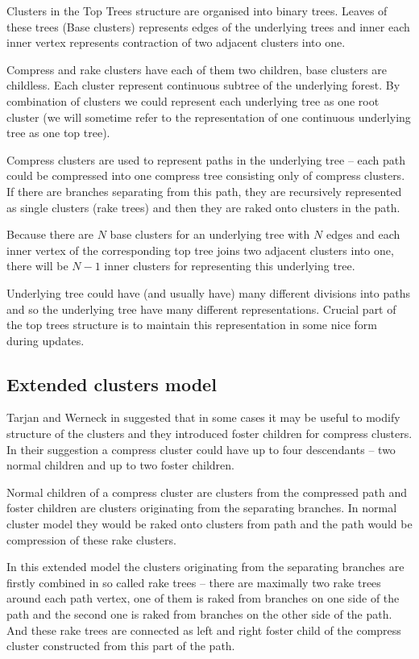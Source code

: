 Clusters in the Top Trees structure are organised into binary trees. Leaves of
these trees (Base clusters) represents edges of the underlying trees and inner
each inner vertex represents contraction of two adjacent clusters into one.

Compress and rake clusters have each of them two children, base clusters are
childless. Each cluster represent continuous subtree of the underlying forest.
By combination of clusters we could represent each underlying tree as one {\I
root cluster} (we will sometime refer to the representation of one continuous
underlying tree as one {\I top tree}).

Compress clusters are used to represent paths in the underlying tree -- each
path could be compressed into one {\I compress tree} consisting only of compress
clusters. If there are branches separating from this path, they are recursively
represented as single clusters ({\I rake trees}) and then they are
{\I raked onto} clusters in the path.

Because there are $N$ base clusters for an underlying tree with $N$ edges and
each inner vertex of the corresponding top tree joins two adjacent clusters into
one, there will be $N-1$ inner clusters for representing this underlying tree.

Underlying tree could have (and usually have) many different divisions into
paths and so the underlying tree have many different representations. Crucial
part of the top trees structure is to maintain this representation in some nice
form during updates.

\subsection{Extended clusters model}

Tarjan and Werneck in \cite{SelfAdjustingTT} suggested that in some cases it may
be useful to modify structure of the clusters and they introduced
{\I foster children} for {\I compress clusters}. In their suggestion a compress
cluster could have up to four descendants -- two normal children and up to two
foster children.

Normal children of a compress cluster are clusters from the compressed path and
foster children are clusters originating from the separating branches. In normal
cluster model they would be raked onto clusters from path and the path would be
compression of these rake clusters.

In this extended model the clusters originating from the separating branches are
firstly combined in so called {\I rake trees} -- there are maximally two rake
trees around each path vertex, one of them is raked from branches on one side of
the path and the second one is raked from branches on the other side of the
path. And these rake trees are connected as left and right foster child of the
compress cluster constructed from this part of the path.


